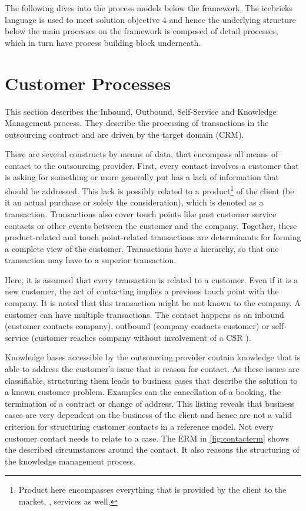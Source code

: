 	 The following dives into the process models below the framework. The icebricks language is used to meet solution objective 4 and hence the underlying structure below the main processes on the framework is composed of detail processes, which in turn have process building block underneath. 
	 
	 
	 \section{Customer Processes}
	 
	 This section describes the Inbound, Outbound, Self-Service and Knowledge Management process. They describe the processing of transactions in the outsourcing contract and are driven by the target domain (\acrshort{CRM}). 
	 
	 There are several constructs by means of data, that encompass all means of contact to the outsourcing provider. First, every contact involves a customer that is asking for something or more generally put has a lack of information that should be addressed. This lack is possibly related to a product\footnote{Product here encompasses everything that is provided by the client to the market, \ie, services as well.} of the client (be it an actual purchase or solely the consideration), which is denoted as a transaction. Transactions also cover touch points like past customer service contacts or other events between the customer and the company. Together, these product-related and touch point-related transactions are determinants for forming a complete view of the customer. Transactions have a hierarchy, so that one transaction may have to a superior transaction. 
	 
	 Here, it is assumed that every transaction is related to a customer. Even if it is a new customer, the act of contacting implies a previous touch point with the company. It is noted that this transaction might be not known to the company. A customer can have multiple transactions. The contact happens as an inbound (customer contacts company), outbound (company contacts customer) or self-service (customer reaches company without involvement of a \acrshort{CSR} ). 
	 
	 Knowledge bases accessible by the outsourcing provider contain knowledge that is able to address the customer's issue that is reason for contact. As these issues are classifiable, structuring them leads to business cases that describe the solution to a known customer problem. Examples can the cancellation of a booking, the termination of a contract or change of address. This listing reveals that business cases are very dependent on the business of the client and hence are not a valid criterion for structuring customer contacts in a reference model. Not every customer contact needs to relate to a case. The \acrshort{ERM} in \Fig \ref{fig:contacterm} shows the described circumstances around the contact. It also reasons the structuring of the knowledge management process. 
	 

